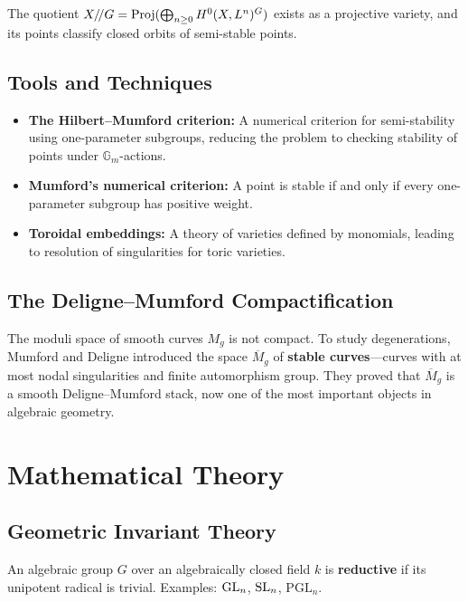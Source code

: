 The quotient $X/\!/G = \operatorname{Proj}(\bigoplus_{n \geq 0} H^0(X, L^n)^G)$ exists as a projective variety, and its points classify closed orbits of semi-stable points.

\subsection{Tools and Techniques}

\begin{itemize}
    \item \textbf{The Hilbert--Mumford criterion:} A numerical criterion for semi-stability using one-parameter subgroups, reducing the problem to checking stability of points under $\mathbb{G}_m$-actions.
    \item \textbf{Mumford's numerical criterion:} A point is stable if and only if every one-parameter subgroup has positive weight.
    \item \textbf{Toroidal embeddings:} A theory of varieties defined by monomials, leading to resolution of singularities for toric varieties.
\end{itemize}

\subsection{The Deligne--Mumford Compactification}

The moduli space of smooth curves $M_g$ is not compact. To study degenerations, Mumford and Deligne introduced the space $\overline{M}_g$ of \textbf{stable curves}---curves with at most nodal singularities and finite automorphism group. They proved that $\overline{M}_g$ is a smooth Deligne--Mumford stack, now one of the most important objects in algebraic geometry.

\section{Mathematical Theory}

\subsection{Geometric Invariant Theory}

\begin{definition}
An algebraic group $G$ over an algebraically closed field $k$ is \textbf{reductive} if its unipotent radical is trivial. Examples: $\operatorname{GL}_n$, $\operatorname{SL}_n$, $\mathrm{PGL}_n$.
\end{definition}

